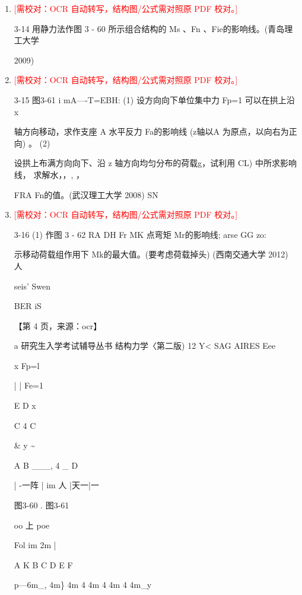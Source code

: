 \documentclass[UTF8,12pt,a4paper,openany]{ctexbook}
\newcommand{\TODO}[1]{\textcolor{red}{[需校对：#1]}}
\begin{document}
\begin{enumerate}[label=\textbf{\arabic*.},leftmargin=2em]
\item \TODO{OCR 自动转写，结构图/公式需对照原 PDF 校对。}\par 3-14 用静力法作图 3 - 60 所示组合结构的 Ms 、Fn 、Fie的影响线。(青岛理工大学\par 2009)
\item \TODO{OCR 自动转写，结构图/公式需对照原 PDF 校对。}\par 3-15 图3-61 i mA—-T=EBH: (1) 设方向向下单位集中力 Fp=1 可以在拱上沿x\par 轴方向移动，求作支座 A 水平反力 Fa的影响线 (z轴以A 为原点，以向右为正向) 。 (2)\par 设拱上布满方向向下、沿 z 轴方向均匀分布的荷载g，试利用 CL) 中所求影响线， 求解水，，, ，\par FRA Fn的值。(武汉理工大学 2008)             SN
\item \TODO{OCR 自动转写，结构图/公式需对照原 PDF 校对。}\par 3-16 (1) 作图 3 - 62 RA DH Fr MK 点弯矩 Mr的影响线; arse GG zo:\par 示移动荷载组作用下 Mk的最大值。(要考虑荷载掉头) (西南交通大学 2012)     人\par seis’ Swen\par BER iS\par \par 【第 4 页，来源：ocr】\par a 研究生入学考试辅导丛书 结构力学〈第二版)           12 Y< SAG AIRES Eee\par x   Fp=l\par |    |                 Fe=1\par E        D                         x\par C                                          4   C\par \&                   y                         \textasciitilde{}\par A                     B              \_\_\_, 4  \_              D\par | -一阵 | im                人   |天一|一\par 图3-60                            .               图3-61\par oo 上 poe\par Fol                       im 2m |\par A        K     B      C    D    E     F\par p—6m\_, 4m\} 4m 4 4m 4 4m 4 4m\_y

\end{enumerate}
\end{document}
